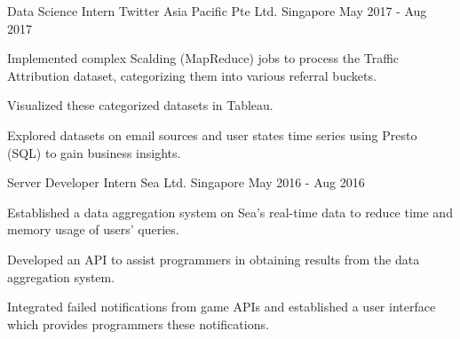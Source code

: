 

\begin{cventries}

	\cventry
	{Data Science Intern} %
	{Twitter Asia Pacific Pte Ltd.} %
	{Singapore} %
	{May 2017 - Aug 2017} %
	{
		\begin{cvitems} %
		\item {Implemented complex Scalding (MapReduce) jobs to process the Traffic Attribution dataset, categorizing them into various referral buckets.}
		\item {Visualized these categorized datasets in Tableau.}
		\item {Explored datasets on email sources and user states time series using Presto (SQL) to gain business insights.}
		\end{cvitems}
	}

	\cventry
	{Server Developer Intern} %
	{Sea Ltd.} %
	{Singapore} %
	{May 2016 - Aug 2016} %
	{
		\begin{cvitems} %
		\item {Established a data aggregation system on Sea's real-time data to reduce time and memory usage of users' queries.}
		\item {Developed an API to assist programmers in obtaining results from the data aggregation system.}
		\item {Integrated failed notifications from game APIs and established a user interface which provides programmers these notifications.}
		\end{cvitems}
	}

\end{cventries}
